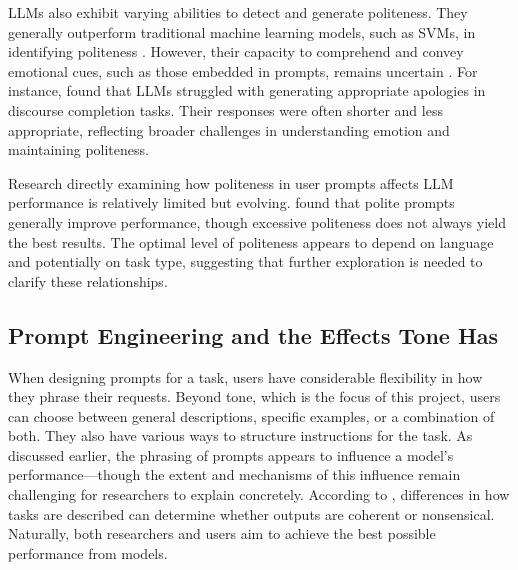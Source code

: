 \documentclass[11pt]{article}
\begin{document}
LLMs also exhibit varying abilities to detect and generate politeness. They generally outperform traditional machine learning models, such as SVMs, in identifying politeness \citep{li23-how-understand}. However, their capacity to comprehend and convey emotional cues, such as those embedded in prompts, remains uncertain \citep{sahoo24-prompt-survey}. For instance, \citep{lee24-potential-pragmatics} found that LLMs struggled with generating appropriate apologies in discourse completion tasks. Their responses were often shorter and less appropriate, reflecting broader challenges in understanding emotion and maintaining politeness.

Research directly examining how politeness in user prompts affects LLM performance is relatively limited but evolving. \citep{yin24-should-respect} found that polite prompts generally improve performance, though excessive politeness does not always yield the best results. The optimal level of politeness appears to depend on language and potentially on task type, suggesting that further exploration is needed to clarify these relationships.


\subsection{Prompt Engineering and the Effects Tone Has}
When designing prompts for a task, users have considerable flexibility in how they phrase their requests. Beyond tone, which is the focus of this project, users can choose between general descriptions, specific examples, or a combination of both. They also have various ways to structure instructions for the task. As discussed earlier, the phrasing of prompts appears to influence a model's performance—though the extent and mechanisms of this influence remain challenging for researchers to explain concretely. According to \cite{bommasani22-foundation-models}, differences in how tasks are described can determine whether outputs are coherent or nonsensical. Naturally, both researchers and users aim to achieve the best possible performance from models.
\end{document}
